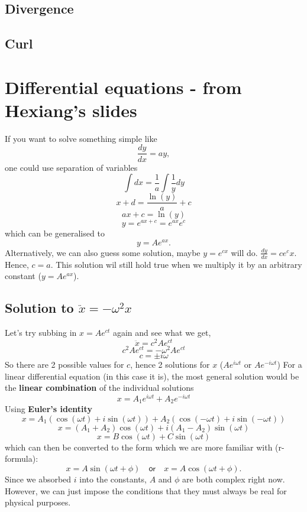 \documentclass[12pt,a4paper]{extreport}
\numberwithin{equation}{chapter}
\begin{document}
            \subsection{Divergence}
            \subsection{Curl}

            \section{Differential equations - from Hexiang's slides}
            If you want to solve something simple like 
            $$\frac{dy}{dx}=ay,$$
            one could use separation of variables
            $$\int dx=\frac{1}{a}\int \frac{1}{y} dy$$
            $$x+d=\frac{\ln(y)}{a}+c$$
            $$ax+c=\ln(y)$$
            $$y=e^{ax+c}=e^{ax}e^c$$
            which can be generalised to 
            $$y=Ae^{ax}.$$
            Alternatively, we can also guess some solution, maybe $y=e^{cx}$ will do. $\frac{dy}{dx}=ce^cx$. Hence, $c=a$. This solution wil still hold true when we multiply it by an arbitrary constant ($y=Ae^{ax}$).

            \subsection{Solution to $\ddot x=-\omega^2 x$}
            Let's try subbing in $x=Ae^{ct}$ again and see what we get,
            $$\ddot x= c^2 A e^{ct}$$
            $$c^2 A e^{ct}=-\omega^2 Ae^{ct}$$
            $$c=\pm i\omega$$
            So there are 2 possible values for $c$, hence 2 solutions for $x$ ($Ae^{i\omega t}$ or $Ae^{-i\omega t}$)
            For a linear differential equation (in this case it is), the most general solution would be the \textbf{linear combination} of the individual solutions
            $$\boxed{x=A_1 e^{i\omega t} + A_2 e^{-i\omega t}}$$
            Using \textbf{Euler's identity}
            $$x=A_1(\cos(\omega t)+i \sin(\omega t))+A_2(\cos(-\omega t)+i \sin(-\omega t))$$
            $$x=(A_1+A_2)\cos(\omega t)+i(A_1-A_2) \sin(\omega t)$$
            $$x=B\cos(\omega t)+C\sin(\omega t)$$
            which can then be converted to the form which we are more familiar with (r-formula): $$\boxed {x=A\sin(\omega t + \phi) \quad \textsf{or}\quad x=A\cos(\omega t + \phi).}$$ Since we absorbed $i$ into the constants, $A$ and $\phi$ are both complex right now. However, we can just impose the conditions that they must always be real for physical purposes. 


      
\end{document}
